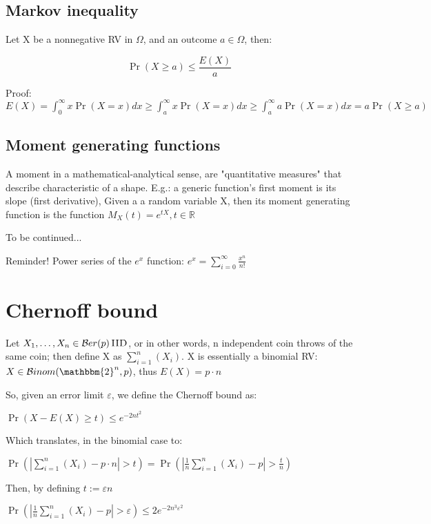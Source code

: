 \documentclass{report}
\newcommand{\binary}{\mathbbm{2}}
\newcommand{\binomdist}{\mathcal{B}inom}
\newcommand{\coin}{\mathcal{B}er}
\newcommand{\iid}{\,\textsc{IID}}
\begin{document}
\subsection{Markov inequality}
	
	Let X be a nonnegative RV in $\Omega$, and an outcome $a \in \Omega$, then:
	
	\begin{equation}
	\Pr(X \geq a) \leq \frac{E(X)}{a}
	\end{equation}
	
	Proof: $ E(X) = \int_{0}^{\infty}x\Pr(X=x)dx \geq \int_{a}^{\infty}x\Pr(X = x)dx \geq \int_{a}^{\infty}a\Pr(X = x)dx = a\Pr(X \geq a)$
	
\subsection{Moment generating functions}
	
	A moment in a mathematical-analytical sense, are "quantitative measures" that describe characteristic of a shape. E.g.: a generic function's first moment is its slope (first derivative), 
	Given a a random variable X, then its moment generating function is the function $M_X(t) = e^{tX}, t \in \mathbb{R}$
	
	To be continued...
	
	Reminder! Power series of the $e^x$ function: $\displaystyle e^x = \sum_{i=0}^{\infty}\frac{x^n}{n!}$
	
	
\section{Chernoff bound}
	
	Let $X_1, \dots, X_n \in \coin(p) \iid$, or in other words, n independent coin throws of the same coin; then define X as $\sum_{i=1}^{n}(X_i)$. X is essentially a binomial RV: $X \in \binomdist(\binary^n, p)$, thus $E(X)=p\cdot n$
	
	So, given an error limit $\varepsilon$, we define the Chernoff bound as:
	
	$\displaystyle \Pr(X-E(X) \geq t)\leq e^{-2nt^2}$
	
	Which translates, in the binomial case to:
	
	$\displaystyle \Pr(|\sum_{i=1}^{n}(X_i) - p \cdot n| > t) = \Pr(|\frac{1}{n}\sum_{i=1}^{n}(X_i) - p| > \frac{t}{n})$

	Then, by defining $t := \varepsilon n$
	
	$\Pr(|\frac{1}{n}\sum_{i=1}^{n}(X_i) - p| > \varepsilon) \leq 2e^{-2n^3\varepsilon^2}$
	
\end{document}
